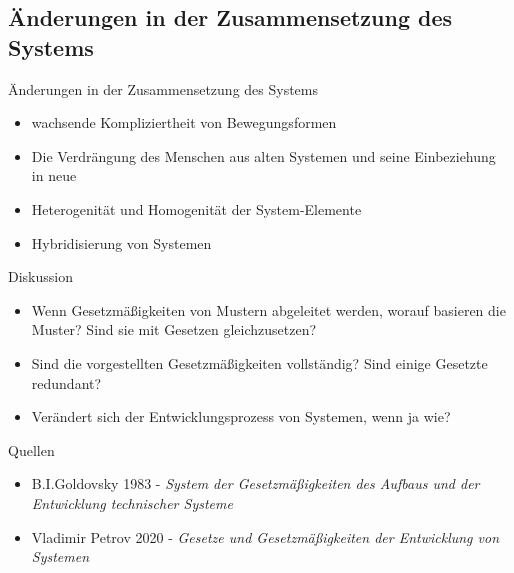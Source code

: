\documentclass{beamer}
\begin{document}
\subsection{Änderungen in der Zusammensetzung des Systems}
\begin{frame}{Änderungen in der Zusammensetzung des Systems}
\begin{itemize}
\item wachsende Kompliziertheit von Bewegungsformen
\item Die Verdrängung des Menschen aus alten Systemen und seine Einbeziehung in neue
\item Heterogenität und Homogenität der System-Elemente
\item Hybridisierung von Systemen
\end{itemize}
\end{frame}

\begin{frame}{Diskussion}
\begin{itemize}
\item Wenn Gesetzmäßigkeiten von Mustern abgeleitet werden, worauf basieren die Muster? Sind sie mit Gesetzen gleichzusetzen?
\item Sind die vorgestellten Gesetzmäßigkeiten vollständig? Sind einige Gesetzte redundant?
\item Verändert sich der Entwicklungsprozess von Systemen, wenn ja wie?
\end{itemize}
\end{frame}

\begin{frame}{Quellen}
\begin{itemize}
\item B.I.Goldovsky 1983 - \emph{System der Gesetzmäßigkeiten des Aufbaus und der Entwicklung technischer Systeme}
\item Vladimir Petrov 2020 - \emph{Gesetze und Gesetzmäßigkeiten der Entwicklung von Systemen}
\end{itemize}
\end{frame}
\end{document}
